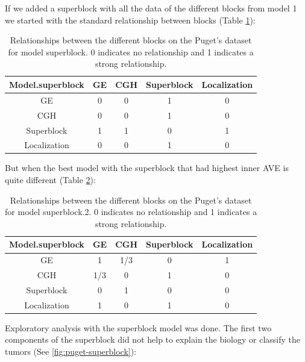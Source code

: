 \documentclass[
  a4paper,
]{book}
\begin{document}
If we added a superblock with all the data of the different blocks from model 1 we started with the standard relationship between blocks (Table \ref{tab:puget-model-superblock}):

\begin{table}

\caption[Model with superblock for Puget's dataset.]{\label{tab:puget-model-superblock}Relationships between the different blocks on the Puget's dataset for model superblock. 0 indicates no relationship and 1 indicates a strong relationship.}
\centering
\begin{tabular}[t]{c|c|c|c|c}
\hline
Model.superblock & GE & CGH & Superblock & Localization\\
\hline
GE & 0 & 0 & 1 & 0\\
\hline
CGH & 0 & 0 & 1 & 0\\
\hline
Superblock & 1 & 1 & 0 & 1\\
\hline
Localization & 0 & 0 & 1 & 0\\
\hline
\end{tabular}
\end{table}

But when the best model with the superblock that had highest inner AVE is quite different (Table \ref{tab:puget-model-superblock-2}):

\begin{table}

\caption[Model with superblock.2 for Puget's dataset.]{\label{tab:puget-model-superblock-2}Relationships between the different blocks on the Puget's dataset for model superblock.2. 0 indicates no relationship and 1 indicates a strong relationship.}
\centering
\begin{tabular}[t]{c|c|c|c|c}
\hline
Model.superblock & GE & CGH & Superblock & Localization\\
\hline
GE & 1 & 1/3 & 0 & 1\\
\hline
CGH & 1/3 & 0 & 1 & 0\\
\hline
Superblock & 0 & 1 & 0 & 0\\
\hline
Localization & 1 & 0 & 1 & 0\\
\hline
\end{tabular}
\end{table}

Exploratory analysis with the superblock model was done.
The first two components of the superblock did not help to explain the biology or classify the tumors (See \ref{fig:puget-superblock}):
\end{document}
